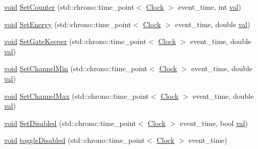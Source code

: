 \begin{DoxyCompactItemize}
\item 
\mbox{\hyperlink{glad_8h_a950fc91edb4504f62f1c577bf4727c29}{void}} \mbox{\hyperlink{class_cognitive_network_a23c6a11d9f15a141f69a9779f174bfb3}{Set\+Counter}} (std\+::chrono\+::time\+\_\+point$<$ \mbox{\hyperlink{universe_8h_a0ef8d951d1ca5ab3cfaf7ab4c7a6fd80}{Clock}} $>$ event\+\_\+time, int \mbox{\hyperlink{glad_8h_a26942fd2ed566ef553eae82d2c109c8f}{val}})
\item 
\mbox{\hyperlink{glad_8h_a950fc91edb4504f62f1c577bf4727c29}{void}} \mbox{\hyperlink{class_cognitive_network_af2f96107858445a0b7be2be6af5b5c01}{Set\+Energy}} (std\+::chrono\+::time\+\_\+point$<$ \mbox{\hyperlink{universe_8h_a0ef8d951d1ca5ab3cfaf7ab4c7a6fd80}{Clock}} $>$ event\+\_\+time, double \mbox{\hyperlink{glad_8h_a26942fd2ed566ef553eae82d2c109c8f}{val}})
\item 
\mbox{\hyperlink{glad_8h_a950fc91edb4504f62f1c577bf4727c29}{void}} \mbox{\hyperlink{class_cognitive_network_a83bc4047721417212fa1bbbfa64da5ee}{Set\+Gate\+Keeper}} (std\+::chrono\+::time\+\_\+point$<$ \mbox{\hyperlink{universe_8h_a0ef8d951d1ca5ab3cfaf7ab4c7a6fd80}{Clock}} $>$ event\+\_\+time, double \mbox{\hyperlink{glad_8h_a26942fd2ed566ef553eae82d2c109c8f}{val}})
\item 
\mbox{\hyperlink{glad_8h_a950fc91edb4504f62f1c577bf4727c29}{void}} \mbox{\hyperlink{class_cognitive_network_a6e2a6ced4ede9a4eef721d6c5aac433c}{Set\+Channel\+Min}} (std\+::chrono\+::time\+\_\+point$<$ \mbox{\hyperlink{universe_8h_a0ef8d951d1ca5ab3cfaf7ab4c7a6fd80}{Clock}} $>$ event\+\_\+time, double \mbox{\hyperlink{glad_8h_a26942fd2ed566ef553eae82d2c109c8f}{val}})
\item 
\mbox{\hyperlink{glad_8h_a950fc91edb4504f62f1c577bf4727c29}{void}} \mbox{\hyperlink{class_cognitive_network_a9c208d66ee284adfceb3b2dd76532a00}{Set\+Channel\+Max}} (std\+::chrono\+::time\+\_\+point$<$ \mbox{\hyperlink{universe_8h_a0ef8d951d1ca5ab3cfaf7ab4c7a6fd80}{Clock}} $>$ event\+\_\+time, double \mbox{\hyperlink{glad_8h_a26942fd2ed566ef553eae82d2c109c8f}{val}})
\item 
\mbox{\hyperlink{glad_8h_a950fc91edb4504f62f1c577bf4727c29}{void}} \mbox{\hyperlink{class_cognitive_network_ac29e676c84244f5b64c0083a0efead28}{Set\+Disabled}} (std\+::chrono\+::time\+\_\+point$<$ \mbox{\hyperlink{universe_8h_a0ef8d951d1ca5ab3cfaf7ab4c7a6fd80}{Clock}} $>$ event\+\_\+time, bool \mbox{\hyperlink{glad_8h_a26942fd2ed566ef553eae82d2c109c8f}{val}})
\item 
\mbox{\hyperlink{glad_8h_a950fc91edb4504f62f1c577bf4727c29}{void}} \mbox{\hyperlink{class_cognitive_network_abeac08d7cbf9df4b36de40aa9301e978}{toggle\+Disabled}} (std\+::chrono\+::time\+\_\+point$<$ \mbox{\hyperlink{universe_8h_a0ef8d951d1ca5ab3cfaf7ab4c7a6fd80}{Clock}} $>$ event\+\_\+time)

\end{DoxyCompactItemize}
